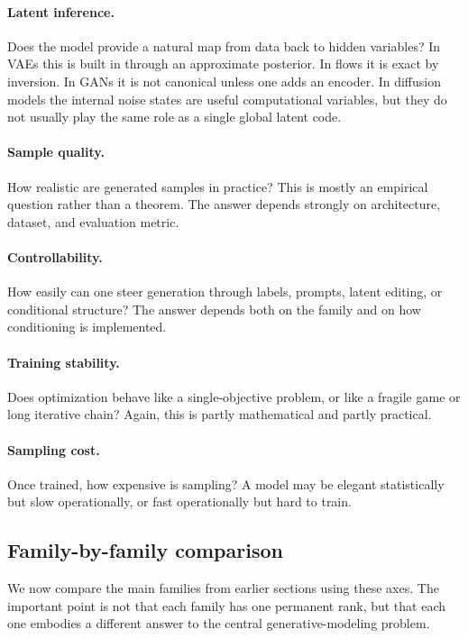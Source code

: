 \paragraph{Latent inference.}
Does the model provide a natural map from data back to hidden variables?
In VAEs this is built in through an approximate posterior.
In flows it is exact by inversion.
In GANs it is not canonical unless one adds an encoder.
In diffusion models the internal noise states are useful computational variables, but they do not usually play the same role as a single global latent code.

\paragraph{Sample quality.}
How realistic are generated samples in practice?
This is mostly an empirical question rather than a theorem.
The answer depends strongly on architecture, dataset, and evaluation metric.

\paragraph{Controllability.}
How easily can one steer generation through labels, prompts, latent editing, or conditional structure?
The answer depends both on the family and on how conditioning is implemented.

\paragraph{Training stability.}
Does optimization behave like a single-objective problem, or like a fragile game or long iterative chain?
Again, this is partly mathematical and partly practical.

\paragraph{Sampling cost.}
Once trained, how expensive is sampling?
A model may be elegant statistically but slow operationally, or fast operationally but hard to train.

\subsection*{Family-by-family comparison}

We now compare the main families from earlier sections using these axes.
The important point is not that each family has one permanent rank, but that each one embodies a different answer to the central generative-modeling problem.

